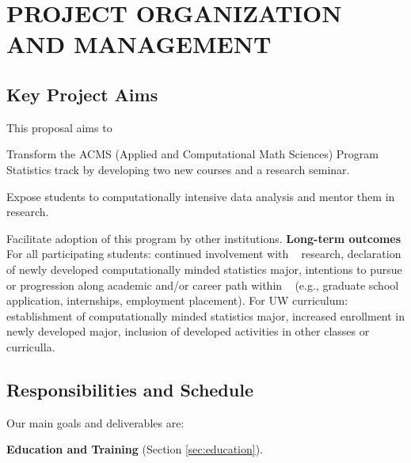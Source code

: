 \section{PROJECT ORGANIZATION AND MANAGEMENT}
\label{plan}

\subsection{                      Key Project Aims                   }
\label{sec:key-aims}
 
This proposal aims to 
\bits
\item Transform the ACMS (Applied and Computational Math Sciences) Program Statistics track
by developing two new courses and a research seminar. 
\item Expose students to computationally intensive data analysis and mentor them in research. 
\item Facilitate adoption of this program by other institutions.
\eits  
{\bf Long-term outcomes} For all participating students: 
continued involvement with \cdse~ research, 
declaration of newly developed computationally minded statistics major,
intentions to pursue or progression along academic and/or career path within \cdse~ (e.g., graduate school application, internships, employment placement). 
For UW curriculum: establishment of computationally minded statistics major,
increased enrollment in newly developed major, inclusion of developed activities in other classes or curriculla.


\subsection{Responsibilities and Schedule}

\vskip 0.1in Our main goals and deliverables are: 
\bits
\item {\bf Education and Training} (Section \ref{sec:education}).

